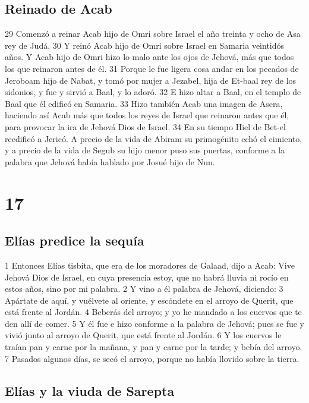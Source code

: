 \section*{Reinado de Acab}

29 Comenzó a reinar Acab hijo de Omri sobre Israel el año treinta y ocho de Asa rey de Judá.
30 Y reinó Acab hijo de Omri sobre Israel en Samaria veintidós años. Y Acab hijo de Omri hizo lo malo ante los ojos de Jehová, más que todos los que reinaron antes de él.
31 Porque le fue ligera cosa andar en los pecados de Jeroboam hijo de Nabat, y tomó por mujer a Jezabel, hija de Et-baal rey de los sidonios, y fue y sirvió a Baal, y lo adoró.
32 E hizo altar a Baal, en el templo de Baal que él edificó en Samaria.
33 Hizo también Acab una imagen de Asera, haciendo así Acab más que todos los reyes de Israel que reinaron antes que él, para provocar la ira de Jehová Dios de Israel.
34 En su tiempo Hiel de Bet-el reedificó a Jericó. A precio de la vida de Abiram su primogénito echó el cimiento, y a precio de la vida de Segub su hijo menor puso sus puertas, conforme a la palabra que Jehová había hablado por Josué hijo de Nun. 

\chapter{17}

\section*{Elías predice la sequía}


1 Entonces Elías tisbita, que era de los moradores de Galaad, dijo a Acab: Vive Jehová Dios de Israel, en cuya presencia estoy, que no habrá lluvia ni rocío en estos años, sino por mi palabra. 
2 Y vino a él palabra de Jehová, diciendo:
3 Apártate de aquí, y vuélvete al oriente, y escóndete en el arroyo de Querit, que está frente al Jordán.
4 Beberás del arroyo; y yo he mandado a los cuervos que te den allí de comer.
5 Y él fue e hizo conforme a la palabra de Jehová; pues se fue y vivió junto al arroyo de Querit, que está frente al Jordán.
6 Y los cuervos le traían pan y carne por la mañana, y pan y carne por la tarde; y bebía del arroyo. 
7 Pasados algunos días, se secó el arroyo, porque no había llovido sobre la tierra.
\section*{Elías y la viuda de Sarepta}

